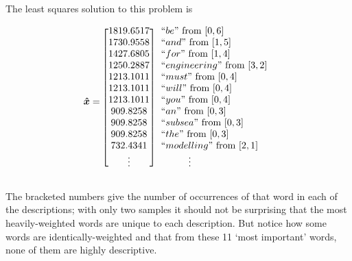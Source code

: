 \documentclass[12pt]{article}
\begin{document}
    The least squares solution to this problem is

    \begin{equation*}
        \bm{\hat{x}} = 
        \begin{blockarray}{[c] l}
            1819.6517 & ``be"           \text{ from } [0, 6] \\
            1730.9558 & ``and"          \text{ from } [1, 5] \\
            1427.6805 & ``for"          \text{ from } [1, 4] \\
            1250.2887 & ``engineering"  \text{ from } [3, 2] \\
            1213.1011 & ``must"         \text{ from } [0, 4] \\
            1213.1011 & ``will"         \text{ from } [0, 4] \\
            1213.1011 & ``you"          \text{ from } [0, 4] \\
            909.8258 & ``an"            \text{ from } [0, 3] \\
            909.8258 & ``subsea"        \text{ from } [0, 3] \\
            909.8258 & ``the"           \text{ from } [0, 3] \\
            732.4341 & ``modelling"     \text{ from } [2, 1] \\
            \vdots & \hspace{1cm}\vdots
        \end{blockarray}
    \end{equation*}

    The bracketed numbers give the number of occurrences of that word in each
    of the descriptions; with only two samples it should not be surprising that
    the most heavily-weighted words are unique to each description.  But notice
    how some words are identically-weighted and that from these 11 `most
    important' words, none of them are highly descriptive.
    
\end{document}
